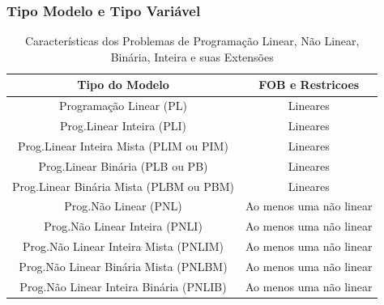 \documentclass{beamer}
\begin{document}
\begin{frame}
	\frametitle{Tipo Modelo e Tipo Variável}
	\begin{table}[]
		\centering
		\caption{Características dos Problemas de Programação Linear, Não Linear, Binária, Inteira e suas Extensões}
		\scriptsize
		\begin{tabular}{| c | c |  }
			\hline
			\hline
			\cellcolor{red!55}Tipo do Modelo  	     & \cellcolor{red!55}FOB e Restricoes \\
			\hline
			\hline
			\cellcolor{green!25}Programação Linear (PL) 			   & \cellcolor{green!25}Lineares \\
			\hline
			\cellcolor{cyan!25}Prog.Linear Inteira (PLI) 			   & \cellcolor{cyan!25}Lineares  \\
			\hline
			\cellcolor{green!25}Prog.Linear Inteira Mista (PLIM ou PIM)& \cellcolor{green!25}Lineares \\
			\hline
			\cellcolor{cyan!25}Prog.Linear Binária (PLB ou PB) 		   & \cellcolor{cyan!25}Lineares   \\
			\hline
			\cellcolor{green!25}Prog.Linear Binária Mista (PLBM ou PBM)& \cellcolor{green!25}Lineares  \\
			\hline
			\cellcolor{cyan!25}Prog.Não Linear (PNL)	 			   & \cellcolor{cyan!25}Ao menos uma não linear  \\
			\hline
			\cellcolor{green!25}Prog.Não Linear Inteira (PNLI)  	   & \cellcolor{green!25}Ao menos uma não linear \\	
			\hline
			\cellcolor{cyan!25}Prog.Não Linear Inteira Mista (PNLIM)   & \cellcolor{cyan!25}Ao menos uma não linear  \\	
			\hline
			\cellcolor{green!25}Prog.Não Linear Binária Mista (PNLBM)  & \cellcolor{green!25}Ao menos uma não linear \\	
			\hline
			\cellcolor{cyan!25}Prog.Não Linear Inteira Binária (PNLIB) & \cellcolor{cyan!25}Ao menos uma não linear  \\	
			\hline
			\hline		
		\end{tabular}
	\end{table}		
\end{frame}
\end{document}
